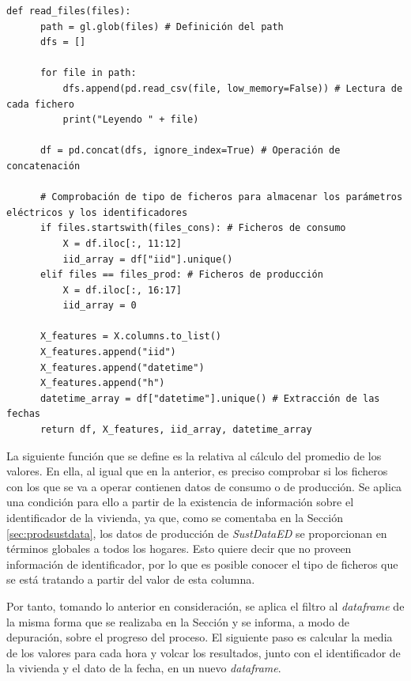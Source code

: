 \begin{lstlisting}[style=Python, caption={Función de lectura de los ficheros}]
  def read_files(files):
      path = gl.glob(files) # Definición del path
      dfs = []

      for file in path:
          dfs.append(pd.read_csv(file, low_memory=False)) # Lectura de cada fichero
          print("Leyendo " + file)

      df = pd.concat(dfs, ignore_index=True) # Operación de concatenación

      # Comprobación de tipo de ficheros para almacenar los parámetros eléctricos y los identificadores
      if files.startswith(files_cons): # Ficheros de consumo
          X = df.iloc[:, 11:12]
          iid_array = df["iid"].unique()
      elif files == files_prod: # Ficheros de producción
          X = df.iloc[:, 16:17]
          iid_array = 0

      X_features = X.columns.to_list()
      X_features.append("iid")
      X_features.append("datetime")
      X_features.append("h")
      datetime_array = df["datetime"].unique() # Extracción de las fechas
      return df, X_features, iid_array, datetime_array
\end{lstlisting}

\vspace{3mm}

La siguiente función que se define es la relativa al cálculo del promedio de los valores. En ella, al igual que en la anterior, es preciso comprobar si los ficheros con los que se va a operar contienen datos de consumo o de producción. Se aplica una condición para ello a partir de la existencia de información sobre el identificador de la vivienda, ya que, como se comentaba en la Sección \ref{sec:prodsustdata}, los datos de producción de \textit{SustDataED} se proporcionan en términos globales a todos los hogares. Esto quiere decir que no proveen información de identificador, por lo que es posible conocer el tipo de ficheros que se está tratando a partir del valor de esta columna.

\vspace{3mm}

Por tanto, tomando lo anterior en consideración, se aplica el filtro al \textit{dataframe} de la misma forma que se realizaba en la Sección \label{sec:datasamples} y se informa, a modo de depuración, sobre el progreso del proceso. El siguiente paso es calcular la media de los valores para cada hora y volcar los resultados, junto con el identificador de la vivienda y el dato de la fecha, en un nuevo \textit{dataframe}.

